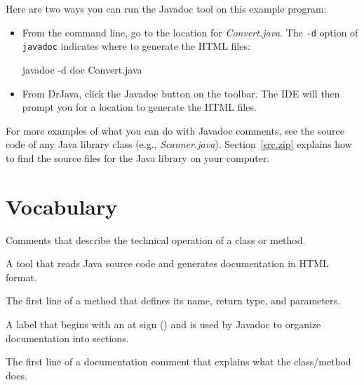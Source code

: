 Here are two ways you can run the Javadoc tool on this example program:

\begin{itemize}


\item From the command line, go to the location for {\it Convert.java}.
The {\tt -d} option of {\tt javadoc} indicates where to generate the HTML files:

\begin{stdout}
javadoc -d doc Convert.java
\end{stdout}

\item From DrJava, click the {\sf Javadoc} button on the toolbar.
The IDE will then prompt you for a location to generate the HTML files.

\end{itemize}

For more examples of what you can do with Javadoc comments, see the source code of any Java library class (e.g., {\it Scanner.java}).
Section~\ref{src.zip} explains how to find the source files for the Java library on your computer.


\section{Vocabulary}

\begin{description}

Comments that describe the technical operation of a class or method.

A tool that reads Java source code and generates documentation in HTML format.

The first line of a method that defines its name, return type, and parameters.

A label that begins with an at sign () and is used by Javadoc to organize documentation into sections.

The first line of a documentation comment that explains what the class/method does.

\end{description}
